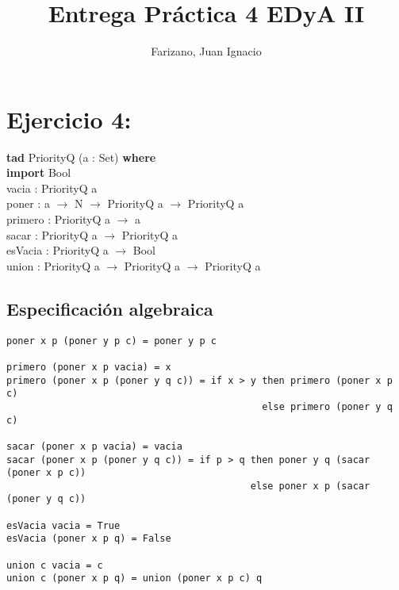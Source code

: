 \documentclass[11pt]{article}
\title{Entrega Práctica 4 EDyA II}
\author{Farizano, Juan Ignacio}
\date{}
\begin{document}
\maketitle

\section*{Ejercicio 4:}

\noindent \textbf{tad} PriorityQ (a : Set) \textbf{where} \\
\indent \textbf{import} Bool \\
\indent vacia : PriorityQ a \\
\indent poner : a $\rightarrow$ N $\rightarrow$ PriorityQ a $\rightarrow$ PriorityQ a \\
\indent primero : PriorityQ a $\rightarrow$ a \\
\indent sacar : PriorityQ a $\rightarrow$ PriorityQ a \\
\indent esVacia : PriorityQ a $\rightarrow$ Bool \\
\indent union : PriorityQ a $\rightarrow$ PriorityQ a $\rightarrow$ PriorityQ a


\subsection*{Especificación algebraica}
\begin{verbatim}
poner x p (poner y p c) = poner y p c

primero (poner x p vacia) = x
primero (poner x p (poner y q c)) = if x > y then primero (poner x p c)
                                             else primero (poner y q c)

sacar (poner x p vacia) = vacia
sacar (poner x p (poner y q c)) = if p > q then poner y q (sacar (poner x p c))
                                           else poner x p (sacar (poner y q c))

esVacia vacia = True
esVacia (poner x p q) = False

union c vacia = c
union c (poner x p q) = union (poner x p c) q
\end{verbatim}

\end{document}
